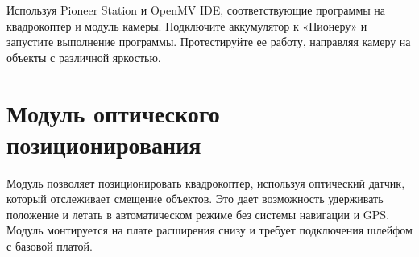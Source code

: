 \documentclass[a4paper,10pt,russian]{sphinxmanual}
\begin{document}
\begin{sphinxVerbatim}[commandchars=\\\{\}]
       
      
          
           
         
        
\end{sphinxVerbatim}

Используя Pioneer Station и OpenMV IDE,  соответствующие программы на квадрокоптер и модуль камеры. Подключите аккумулятор к «Пионеру» и запустите выполнение программы. Протестируйте ее работу, направляя камеру на объекты с различной яркостью.


\section{Модуль оптического позиционирования}
\label{\detokenize{module/optic:id1}}\label{\detokenize{module/optic::doc}}

Модуль позволяет позиционировать квадрокоптер, используя оптический датчик, который отслеживает смещение объектов. Это дает возможность удерживать положение и летать в автоматическом режиме без системы навигации и GPS.
Модуль монтируется на плате расширения снизу и требует подключения шлейфом с базовой платой.
\end{document}

